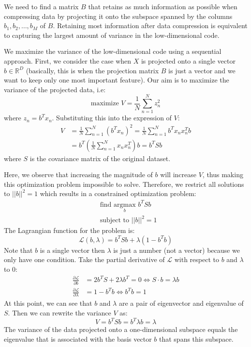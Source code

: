 \documentclass[a4paper, 12pt]{article}  %
\begin{document}
We need to find a matrix $B$ that retains as much information as possible when compressing data by projecting it onto the subspace spanned by the columns $b_1, b_2, \hdots, b_M$ of $B$. Retaining most information after data compression is equivalent to capturing the largest amount of variance in the low-dimensional code.

We maximize the variance of the low-dimensional code using a sequential approach. First, we consider the case when $X$ is projected onto a single vector $b \in \mathbb{R}^D$ (basically, this is when the projection matrix $B$ is just a vector and we want to keep only one most important feature). Our aim is to maximize the variance of the projected data, i.e: \[\text{maximize } V = \frac{1}{N} \sum^N_{n = 1} z_n^2\]
where \(z_n = b^T x_n\). Substituting this into the expression of $V$:
\begin{align*}
    V &= \frac{1}{N} \sum^N_{n = 1} (b^T x_n)^2 = \frac{1}{N} \sum^N_{n = 1} b^T x_n x_n^T b\\
    &= b^T (\frac{1}{N} \sum^N_{n = 1} x_n x_n^T) b = b^T S b
\end{align*}
where $S$ is the covariance matrix of the original dataset. 

Here, we observe that increasing the magnitude of $b$ will increase $V$, thus making this optimization problem impossible to solve. Therefore, we restrict all solutions to $||b||^2 = 1$ which results in a constrained optimization problem:
\begin{align*}
    &\text{find } \underset{b}{\mathrm{argmax}} \,\, b^T S b \\
    &\text{subject to } ||b||^2 = 1
\end{align*}
The Lagrangian function for the problem is:
\[\mathcal{L}(b, \lambda) = b^T S b + \lambda(1 - b^T b)\]
Note that $b$ is a single vector then $\lambda$ is just a number (not a vector) because we only have one condition. Take the partial derivative of $\mathcal{L}$ with respect to $b$ and $\lambda$ to 0:
\begin{align*}
    \frac{\partial \mathcal{L}}{\partial b} &= 2 b^T S + 2 \lambda b^T = 0 \Longleftrightarrow S\cdot b = \lambda b \\
    \frac{\partial \mathcal{L}}{\partial \lambda} &= 1 - b^T b \Longleftrightarrow b^T b = 1
\end{align*}
At this point, we can see that $b$ and $\lambda$ are a pair of eigenvector and eigenvalue of $S$. Then we can rewrite the variance $V$ as:
\[V = b^T S b = b^T \lambda b = \lambda\]
The variance of the data projected onto a one-dimensional subspace equals the eigenvalue that is associated with the basis vector $b$ that spans this subspace.
\end{document}
